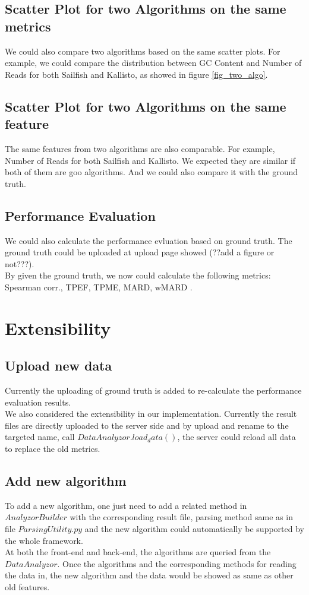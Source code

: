 \documentclass[11pt,letter]{article}
\begin{document}
\subsection {Scatter Plot for two Algorithms on the same metrics}
We could also compare two algorithms based on the same scatter plots. For example, we could compare the distribution between GC Content and Number of Reads for both Sailfish and Kallisto, as showed in figure \ref{fig_two_algo}.

\subsection {Scatter Plot for two Algorithms on the same feature}
The same features from two algorithms are also comparable. For example, Number of Reads for both Sailfish and Kallisto. We expected they are similar if both of them are goo algorithms. And we could also compare it with the ground truth.

\subsection {Performance Evaluation}
We could also calculate the performance evluation based on ground truth. The ground truth could be uploaded at upload page showed (??add a figure or not???). \\
By given the ground truth, we now could calculate the following metrics: Spearman corr., TPEF, TPME, MARD, wMARD \cite{rapmap}.

\section {Extensibility}
\subsection {Upload new data}
Currently the uploading of ground truth is added to re-calculate the performance evaluation results. \\
We also considered the extensibility in our implementation. Currently the result files are directly uploaded to the server side and by upload and rename to the targeted name, call $DataAnalyzor.load_data()$, the server could reload all data to replace the old metrics.
\subsection {Add new algorithm}
To add a new algorithm, one just need to add a related method in $AnalyzorBuilder$  with the corresponding result file, parsing method same as in file $ParsingUtility.py$ and the new algorithm could automatically be supported by the whole framework. \\
At both the front-end and back-end, the algorithms are queried from the $DataAnalyzor$. Once the algorithms and the corresponding methods for reading the data in, the new algorithm and the data would be showed as same as other old features.
\end{document}
